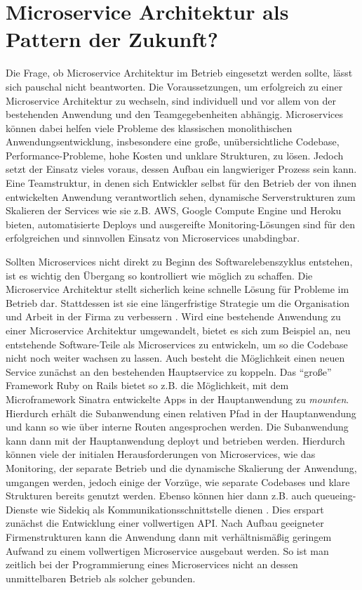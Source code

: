 \chapter{Microservice Architektur als Pattern der Zukunft?}

Die Frage, ob Microservice Architektur im Betrieb eingesetzt werden sollte, lässt sich pauschal nicht beantworten. Die Voraussetzungen, um erfolgreich zu einer Microservice Architektur zu wechseln, sind individuell und vor allem von der bestehenden Anwendung und den Teamgegebenheiten abhängig. Microservices können dabei helfen viele Probleme des klassischen monolithischen Anwendungsentwicklung, insbesondere eine große, unübersichtliche Codebase, Performance-Probleme, hohe Kosten und unklare Strukturen, zu lösen. Jedoch setzt der Einsatz vieles voraus, dessen Aufbau ein langwieriger Prozess sein kann. Eine Teamstruktur, in denen sich Entwickler selbst für den Betrieb der von ihnen entwickelten Anwendung verantwortlich sehen, dynamische Serverstrukturen  zum Skalieren der Services wie sie z.B. AWS, Google Compute Engine und Heroku bieten, automatisierte Deploys und ausgereifte Monitoring-Lösungen sind für den erfolgreichen und sinnvollen Einsatz von Microservices unabdingbar.

Sollten Microservices nicht direkt zu Beginn des Softwarelebenszyklus entstehen, ist es wichtig den Übergang so kontrolliert wie möglich zu schaffen. Die Microservice Architektur stellt sicherlich keine schnelle Lösung für Probleme im Betrieb dar. Stattdessen ist sie eine längerfristige Strategie um die Organisation und Arbeit in der Firma zu verbessern \cite{newman2015building}. Wird eine bestehende Anwendung zu einer Microservice Architektur umgewandelt, bietet es sich zum Beispiel an, neu entstehende Software-Teile als Microservices zu entwickeln, um so die Codebase nicht noch weiter wachsen zu lassen. Auch besteht die Möglichkeit einen neuen Service zunächst an den bestehenden Hauptservice zu koppeln. Das \enquote{große} Framework Ruby on Rails bietet so z.B. die Möglichkeit, mit dem Microframework Sinatra entwickelte Apps in der Hauptanwendung zu \textit{mounten}. Hierdurch erhält die Subanwendung einen relativen Pfad in der Hauptanwendung und kann so wie über interne Routen angesprochen werden. Die Subanwendung kann dann mit der Hauptanwendung deployt und betrieben werden. Hierdurch können viele der initialen Herausforderungen von Microservices, wie das Monitoring, der separate Betrieb und die dynamische Skalierung der Anwendung, umgangen werden, jedoch einige der Vorzüge, wie separate Codebases und klare Strukturen bereits genutzt werden. Ebenso können hier dann z.B. auch queueing-Dienste wie Sidekiq als Kommunikationsschnittstelle dienen \cite[vgl.][]{sidekiqmessaging}. Dies erspart zunächst die Entwicklung einer vollwertigen API. Nach Aufbau geeigneter Firmenstrukturen kann die Anwendung dann mit verhältnismäßig geringem Aufwand zu einem vollwertigen Microservice ausgebaut werden. So ist man zeitlich bei der Programmierung eines Microservices nicht an dessen unmittelbaren Betrieb als solcher gebunden.

